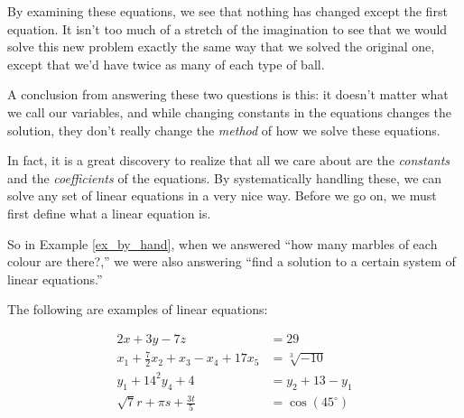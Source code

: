 By examining these equations, we see that nothing has changed except the first equation. It isn't too much of a stretch of the imagination to see that we would solve this new problem exactly the same way that we solved the original one, except that we'd have twice as many of each type of ball.



A conclusion from answering these two questions is this: it doesn't matter what we call our variables, and while changing constants in the equations changes the solution, they don't really change the {\em method} of how we solve these equations.

In fact, it is a great discovery to realize that all we care about are the {\em constants} and the {\em coefficients} of the equations. By systematically handling these, we can solve any set of linear equations in a very nice way. Before we go on, we must first define what a  linear equation is. 

\smallskip


\smallskip

So in Example \ref{ex_by_hand}, when we answered ``how many marbles of each colour are there?,'' we were also answering ``find a solution to a certain system of linear equations.''

The following are examples of linear equations:

\begin{align*}
2x+3y-7z&=29\\
x_1+\frac72x_2+x_3-x_4+17x_5&=\sqrt[3]{-10}\\
y_1+14^2y_4+4&=y_2+13-y_1\\
\sqrt{7}r+\pi s +\frac{3t}{5}&= \cos(45^\circ)
\end{align*}


